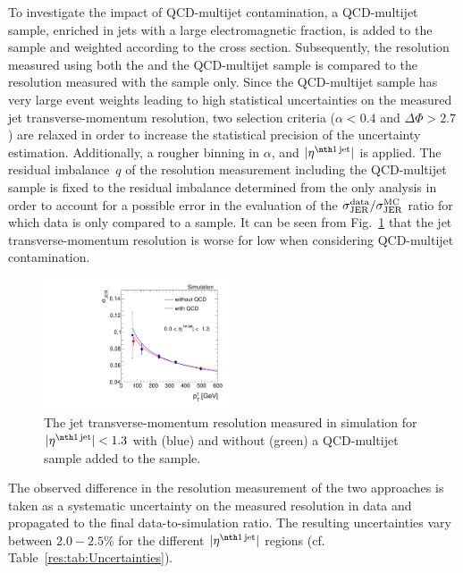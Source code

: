 To investigate the impact of QCD-multijet contamination, a QCD-multijet sample, enriched in jets with a large electromagnetic fraction, is added to the \GAMJET sample and weighted according to the cross section.
Subsequently, the resolution measured using both the \GAMJET and the QCD-multijet sample is compared to the resolution measured with the \GAMJET sample only.
Since the QCD-multijet sample has very large event weights leading to high statistical uncertainties on the measured jet transverse-momentum resolution, two selection criteria ($\alpha<0.4$ and $\Delta\Phi>2.7$) are relaxed in order to increase the statistical precision of the uncertainty estimation.
Additionally, a rougher binning in $\alpha$, \ptgamma and $|\etafirstjet|$ is applied.
The residual imbalance~$q$ of the resolution measurement including the QCD-multijet sample is fixed to the residual imbalance determined from the \GAMJET only analysis in order to account for a possible error in the evaluation of the $\sigma_\mathrm{JER}^{\text{data}}/\sigma_\mathrm{JER}^{\text{MC}}$ ratio for which data is only compared to a \GAMJET sample.
It can be seen from Fig.~\ref{res:fig:QCDuncertainty} that the jet transverse-momentum resolution is worse for low \ptgamma when considering QCD-multijet contamination.
\begin{figure}[!b]
  \centering
      \includegraphics[width=0.49\textwidth]{figures/resolution/systematicUncertainties/Resolution_for_1_eta_bin_QCDUncertainty_RMS99.pdf}
  \caption{The jet transverse-momentum resolution measured in simulation for $|\etafirstjet| < 1.3$ with (blue) and without (green) a QCD-multijet sample added to the \GAMJET sample.}  
  \label{res:fig:QCDuncertainty}
\end{figure}

The observed difference in the resolution measurement of the two approaches is taken as a systematic uncertainty on the measured resolution in data and propagated to the final data-to-simulation ratio.
The resulting uncertainties vary between $2.0-2.5\%$ for the different $|\etafirstjet|$ regions (cf. Table~\ref{res:tab:Uncertainties}).

